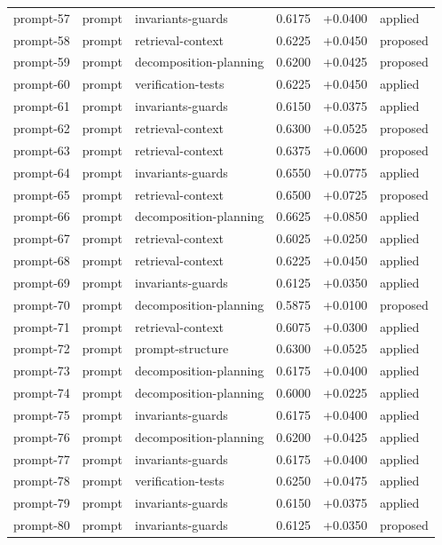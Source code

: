 \begin{center}
\begin{longtable}{llp{5.2cm}rrl}
prompt-57 & prompt & invariants-guards & 0.6175 & +0.0400 & applied \\
prompt-58 & prompt & retrieval-context & 0.6225 & +0.0450 & proposed \\
prompt-59 & prompt & decomposition-planning & 0.6200 & +0.0425 & proposed \\
prompt-60 & prompt & verification-tests & 0.6225 & +0.0450 & applied \\
prompt-61 & prompt & invariants-guards & 0.6150 & +0.0375 & applied \\
prompt-62 & prompt & retrieval-context & 0.6300 & +0.0525 & proposed \\
prompt-63 & prompt & retrieval-context & 0.6375 & +0.0600 & proposed \\
prompt-64 & prompt & invariants-guards & 0.6550 & +0.0775 & applied \\
prompt-65 & prompt & retrieval-context & 0.6500 & +0.0725 & proposed \\
prompt-66 & prompt & decomposition-planning & 0.6625 & +0.0850 & applied \\
prompt-67 & prompt & retrieval-context & 0.6025 & +0.0250 & applied \\
prompt-68 & prompt & retrieval-context & 0.6225 & +0.0450 & applied \\
prompt-69 & prompt & invariants-guards & 0.6125 & +0.0350 & applied \\
prompt-70 & prompt & decomposition-planning & 0.5875 & +0.0100 & proposed \\
prompt-71 & prompt & retrieval-context & 0.6075 & +0.0300 & applied \\
prompt-72 & prompt & prompt-structure & 0.6300 & +0.0525 & applied \\
prompt-73 & prompt & decomposition-planning & 0.6175 & +0.0400 & applied \\
prompt-74 & prompt & decomposition-planning & 0.6000 & +0.0225 & applied \\
prompt-75 & prompt & invariants-guards & 0.6175 & +0.0400 & applied \\
prompt-76 & prompt & decomposition-planning & 0.6200 & +0.0425 & applied \\
prompt-77 & prompt & invariants-guards & 0.6175 & +0.0400 & applied \\
prompt-78 & prompt & verification-tests & 0.6250 & +0.0475 & applied \\
prompt-79 & prompt & invariants-guards & 0.6150 & +0.0375 & applied \\
prompt-80 & prompt & invariants-guards & 0.6125 & +0.0350 & proposed \\

\end{longtable}
\end{center}
